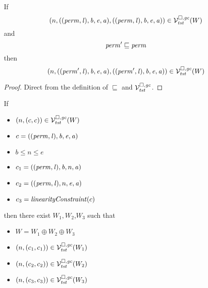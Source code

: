\begin{lemma}
  \label{lem:cap-in-lrv-mono-perm}
  If
  \[
    \left(n,((\mathit{perm},\mathit{l}),\mathit{b},\mathit{e},\mathit{a}),((\mathit{perm},\mathit{l}),\mathit{b},\mathit{e},\mathit{a})\right) \in \mathcal{V}^{\square,\mathit{gc}}_{\mathit{tst}}(W)
  \]
  and
  \[
    \mathit{perm}' \sqsubseteq \mathit{perm}
  \]
  then
  \[
    \left(n,((\mathit{perm}',\mathit{l}),\mathit{b},\mathit{e},\mathit{a}),((\mathit{perm}',\mathit{l}),\mathit{b},\mathit{e},\mathit{a})\right) \in \mathcal{V}^{\square,\mathit{gc}}_{\mathit{tst}}(W)
  \]
\end{lemma}
\begin{proof}
  Direct from the definition of $\sqsubseteq$ and $\mathcal{V}^{\square,\mathit{gc}}_{\mathit{tst}}$.
\end{proof}

\begin{lemma}
  \label{lem:splitting-safety-normal}
  If
  \begin{itemize}
  \item $\left(n,(c,c)\right) \in \mathcal{V}^{\square,\mathit{gc}}_{\mathit{tst}}(W)$
  \item $c = ((\mathit{perm},\mathit{l}),\mathit{b},\mathit{e},\mathit{a})$
  \item $b \le n \le e$
  \item $c_1 = ((\mathit{perm},\mathit{l}),\mathit{b},n,\mathit{a})$
  \item $c_2 = ((\mathit{perm},\mathit{l}),n,\mathit{e},\mathit{a})$
  \item $c_3 = \linCons{c}$
  \end{itemize}
  then there exist $W_1,W_2$,$W_3$ such that
  \begin{itemize}
  \item $W = W_1 \oplus W_2 \oplus W_3$
  \item $\left(n,(c_1,c_1)\right) \in \mathcal{V}^{\square,\mathit{gc}}_{\mathit{tst}}(W_1)$
  \item $\left(n,(c_2,c_2)\right) \in \mathcal{V}^{\square,\mathit{gc}}_{\mathit{tst}}(W_2)$
  \item $\left(n,(c_3,c_3)\right) \in \mathcal{V}^{\square,\mathit{gc}}_{\mathit{tst}}(W_3)$
  \end{itemize}
\end{lemma}
